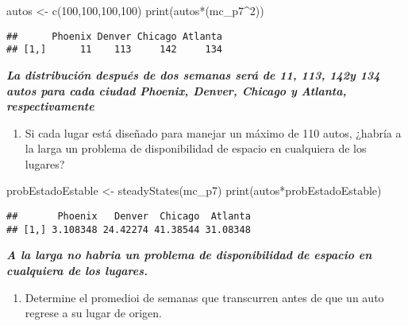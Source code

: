 \documentclass[
]{article}
\newenvironment{Shaded}{\begin{snugshade}}{\end{snugshade}}
\newcommand{\DecValTok}[1]{\textcolor[rgb]{0.00,0.00,0.81}{#1}}
\newcommand{\FunctionTok}[1]{\textcolor[rgb]{0.00,0.00,0.00}{#1}}
\newcommand{\NormalTok}[1]{#1}
\newcommand{\OtherTok}[1]{\textcolor[rgb]{0.56,0.35,0.01}{#1}}
\newcommand{\SpecialCharTok}[1]{\textcolor[rgb]{0.00,0.00,0.00}{#1}}
\providecommand{\tightlist}{%
  \setlength{\itemsep}{0pt}\setlength{\parskip}{0pt}}
\begin{document}
\begin{Shaded}
\begin{Highlighting}[]
\NormalTok{autos }\OtherTok{\textless{}{-}} \FunctionTok{c}\NormalTok{(}\DecValTok{100}\NormalTok{,}\DecValTok{100}\NormalTok{,}\DecValTok{100}\NormalTok{,}\DecValTok{100}\NormalTok{)}
\FunctionTok{print}\NormalTok{(autos}\SpecialCharTok{*}\NormalTok{(mc\_p7}\SpecialCharTok{\^{}}\DecValTok{2}\NormalTok{))}
\end{Highlighting}
\end{Shaded}

\begin{verbatim}
##      Phoenix Denver Chicago Atlanta
## [1,]      11    113     142     134
\end{verbatim}

\textbf{\emph{La distribución después de dos semanas será de 11, 113,
142y 134 autos para cada ciudad Phoenix, Denver, Chicago y Atlanta,
respectivamente}}

\begin{enumerate}
\def\labelenumi{\alph{enumi})}
\setcounter{enumi}{2}
\tightlist
\item
  Si cada lugar está diseñado para manejar un máximo de 110 autos,
  ¿habría a la larga un problema de disponibilidad de espacio en
  cualquiera de los lugares?
\end{enumerate}

\begin{Shaded}
\begin{Highlighting}[]
\NormalTok{probEstadoEstable }\OtherTok{\textless{}{-}} \FunctionTok{steadyStates}\NormalTok{(mc\_p7)}
\FunctionTok{print}\NormalTok{(autos}\SpecialCharTok{*}\NormalTok{probEstadoEstable)}
\end{Highlighting}
\end{Shaded}

\begin{verbatim}
##       Phoenix   Denver  Chicago  Atlanta
## [1,] 3.108348 24.42274 41.38544 31.08348
\end{verbatim}

\textbf{\emph{A la larga no habria un problema de disponibilidad de
espacio en cualquiera de los lugares.}}

\begin{enumerate}
\def\labelenumi{\alph{enumi})}
\setcounter{enumi}{3}
\tightlist
\item
  Determine el promedioi de semanas que transcurren antes de que un auto
  regrese a su lugar de origen.
\end{enumerate}
\end{document}
